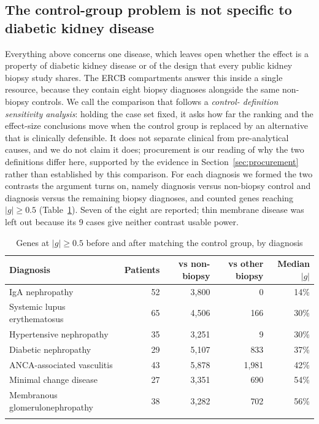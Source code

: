 \documentclass[pdflatex,sn-vancouver-num]{sn-jnl}
\theoremstyle{thmstyleone}
\theoremstyle{thmstyletwo}
\theoremstyle{thmstylethree}
\begin{document}
\subsection{The control-group problem is not specific to diabetic kidney
disease}\label{sec:external}

Everything above concerns one disease, which leaves open whether the effect is a property of
diabetic kidney disease or of the design that every public kidney biopsy study shares. The ERCB
compartments answer this inside a single resource, because they contain eight biopsy diagnoses
alongside the same non-biopsy controls. We call the comparison that follows a \emph{control-
definition sensitivity analysis}: holding the case set fixed, it asks how far the ranking and
the effect-size conclusions move when the control group is replaced by an alternative that is
clinically defensible. It does not separate clinical from pre-analytical causes, and we do not
claim it does; procurement is our reading of why the two definitions differ here, supported
by the evidence in Section~\ref{sec:procurement} rather than established by this comparison. For each diagnosis we formed the two contrasts the
argument turns on, namely diagnosis versus non-biopsy control and diagnosis versus the
remaining biopsy diagnoses, and counted genes reaching $|g| \ge 0.5$ (Table~\ref{tab:ckdgen}). Seven of the
eight are reported; thin membrane disease was left out because its 9 cases give neither
contrast usable power.

\begin{table}[h]
\caption{Genes at $|g| \ge 0.5$ before and after matching the control group, by
diagnosis}\label{tab:ckdgen}
\begin{tabular}{@{}lrrrr@{}}
\toprule
Diagnosis & Patients & vs non-biopsy & vs other biopsy & Median $|g|$ \\
\midrule
IgA nephropathy               & 52 & 3{,}800 & 0     & 14\% \\
Systemic lupus erythematosus  & 65 & 4{,}506 & 166   & 30\% \\
Hypertensive nephropathy      & 35 & 3{,}251 & 9     & 30\% \\
Diabetic nephropathy          & 29 & 5{,}107 & 833   & 37\% \\
ANCA-associated vasculitis    & 43 & 5{,}878 & 1{,}981 & 42\% \\
Minimal change disease        & 27 & 3{,}351 & 690   & 54\% \\
Membranous glomerulonephropathy & 38 & 3{,}282 & 702 & 56\% \\
\botrule
\end{tabular}
\end{table}
\end{document}
